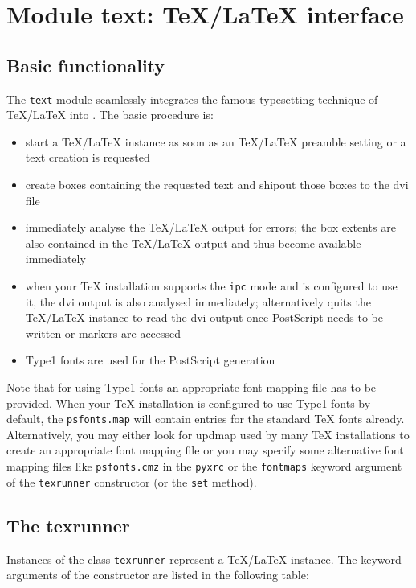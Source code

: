 \chapter{Module text: \TeX/\LaTeX{} interface}
\label{module:text}

\section{Basic functionality}

The \verb|text| module seamlessly integrates the famous typesetting
technique of \TeX/\LaTeX{} into \PyX. The basic procedure is:
\begin{itemize}
\item start a \TeX/\LaTeX{} instance as soon as an \TeX/\LaTeX{}
preamble setting or a text creation is requested
\item create boxes containing the requested text and shipout those
boxes to the dvi file
\item immediately analyse the \TeX/\LaTeX{} output for errors; the box
extents are also contained in the \TeX/\LaTeX{} output and thus become
available immediately
\item when your TeX installation supports the \verb|ipc| mode and
\PyX{} is configured to use it, the dvi output is also analysed
immediately; alternatively \PyX{} quits the \TeX/\LaTeX{} instance to
read the dvi output once PostScript needs to be written or markers are
accessed
\item Type1 fonts are used for the PostScript generation
\end{itemize}

Note that for using Type1 fonts an appropriate font mapping file has
to be provided. When your \TeX{} installation is configured to use
Type1 fonts by default, the \verb|psfonts.map| will contain entries
for the standard \TeX{} fonts already. Alternatively, you may either
look for updmap used by many \TeX{} installations to create an
appropriate font mapping file or you may specify some alternative
font mapping files like \verb|psfonts.cmz| in the \verb|pyxrc| or the
\verb|fontmaps| keyword argument of the \verb|texrunner| constructor
(or the \verb|set| method).

\section{The texrunner}
Instances of the class \verb|texrunner| represent a \TeX/\LaTeX{}
instance. The keyword arguments of the constructor are listed in the
following table:

